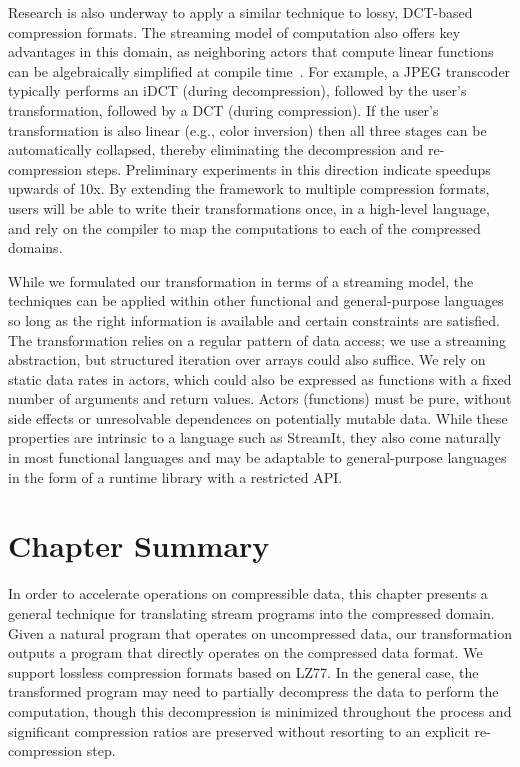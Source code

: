 Research is also underway to apply a similar technique to lossy,
DCT-based compression formats.  The streaming model of computation
also offers key advantages in this domain, as neighboring actors that
compute linear functions can be algebraically simplified at compile
time~\cite{aalamb}.  For example, a JPEG transcoder typically performs
an iDCT (during decompression), followed by the user's transformation,
followed by a DCT (during compression).  If the user's transformation
is also linear (e.g., color inversion) then all three stages can be
automatically collapsed, thereby eliminating the decompression and
re-compression steps.  Preliminary experiments in this direction
indicate speedups upwards of 10x.  By extending the framework to
multiple compression formats, users will be able to write their
transformations once, in a high-level language, and rely on the
compiler to map the computations to each of the compressed domains.

While we formulated our transformation in terms of a streaming model,
the techniques can be applied within other functional and
general-purpose languages so long as the right information is
available and certain constraints are satisfied.  The transformation
relies on a regular pattern of data access; we use a streaming
abstraction, but structured iteration over arrays could also suffice.
We rely on static data rates in actors, which could also be expressed
as functions with a fixed number of arguments and return values.
Actors (functions) must be pure, without side effects or unresolvable
dependences on potentially mutable data.  While these properties are
intrinsic to a language such as StreamIt, they also come naturally in
most functional languages and may be adaptable to general-purpose
languages in the form of a runtime library with a restricted API.

\section{Chapter Summary}


In order to accelerate operations on compressible data, this chapter
presents a general technique for translating stream programs into the
compressed domain.  Given a natural program that operates on
uncompressed data, our transformation outputs a program that directly
operates on the compressed data format.  We support lossless
compression formats based on LZ77.  In the general case, the
transformed program may need to partially decompress the data to
perform the computation, though this decompression is minimized
throughout the process and significant compression ratios are
preserved without resorting to an explicit re-compression step.

